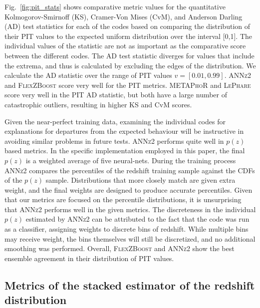 Fig.~\ref{fig:pit_stats} shows comparative metric values for the quantitative Kolmogorov-Smirnoff (KS), Cramer-Von Mises (CvM), and Anderson Darling (AD) test statistics for each of the codes based on comparing the distribution of their PIT values to the expected uniform distribution over the interval [0,1].  The individual values of the statistic are not as important as the comparative score between the different codes.
The AD test statistic diverges for values that include the extrema, and thus is calculated by excluding the edges of the distribution.
We calculate the AD statistic over the range of PIT values $v=[0.01,0.99]$.  \textsc{ANNz2} and \textsc{FlexZBoost} score very well for the PIT metrics.
\textsc{METAPhoR} and \textsc{LePhare} score very well in the PIT AD statistic, but both have a large number of catastrophic outliers, resulting in higher KS and CvM scores.

Given the near-perfect training data, examining the individual codes for explanations for departures from the expected behaviour will be instructive in avoiding similar problems in future tests.
\textsc{ANNz2} performs quite well in $p(z)$ based metrics.  In the specific implementation employed in this paper, the final $p(z)$ is a weighted average of five neural-nets.  During the training process \textsc{ANNz2} compares the percentiles of the redshift training sample against the CDFs of the $p(z)$ sample.  Distributions that more closely match are given extra weight, and the final weights are designed to produce accurate percentiles.  Given that our metrics are focused on the percentile distributions, it is unsurprising that \textsc{ANNz2} performs well in the given metrics.  The discreteness in the individual $p(z)$ estimated by \textsc{ANNz2} can be attributed to the fact that the code was run as a classifier, assigning weights to discrete bins of redshift.  While multiple bins may receive weight, the bins themselves will still be discretized, and no additional smoothing was performed.
Overall, \textsc{FlexZBoost} and \textsc{ANNz2} show the best ensemble agreement in their distribution of PIT values.

\subsection{Metrics of the stacked estimator of the redshift distribution}\label{sec:stackedmetrics}

